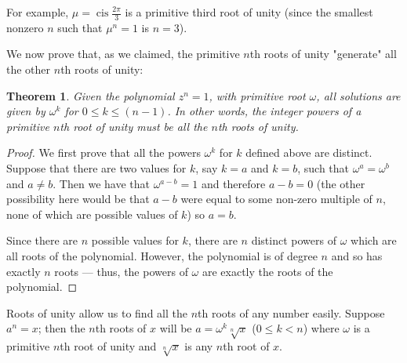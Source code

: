 \documentclass[a4paper,10pt,titlepage]{article}
\newtheorem*{thm}{Theorem}
\theoremstyle{definition}
\DeclareMathOperator{\cis}{cis}
\begin{document}
For example, $ \mu = \cis \frac{2\pi}{3} $ is a primitive third root of unity (since the smallest
nonzero $ n $ such that $ \mu^n = 1 $ is $ n = 3 $).

We now prove that, as we claimed, the primitive $n$th roots of unity "generate" all the other
$ n$th roots of unity:
\begin{thm}
  Given the polynomial $ z^n = 1 $, with primitive root $ \omega $, all solutions
  are given by $ \omega^k $ for $ 0 \leq k \leq (n - 1) $. In other words,
  the integer powers of a primitive $ n$th root of unity must be \emph{all} the
  $n$th roots of unity.
\end{thm}

\begin{proof}
  We first prove that all the powers $ \omega^k $ for $ k $ defined above are distinct.
  Suppose that there are two values for $ k $, say
  $ k = a $ and $ k = b $, such that $ \omega^a = \omega^b $ and $ a \neq b $. Then we have
  that $ \omega^{a-b} = 1 $ and therefore $ a - b = 0 $ (the other possibility here would be
  that $ a - b $ were equal to some non-zero multiple of $ n $, none of which are possible
  values of $ k $) so $ a = b $.

  Since there are $ n $ possible values for $ k $, there are $ n $ distinct powers of $ \omega $
  which are all roots of the polynomial. However, the polynomial is of degree $ n $ and so has
  exactly $ n $ roots --- thus, the powers of $ \omega $ are exactly the roots of the polynomial.
\end{proof}

Roots of unity allow us to find all the $ n$th roots of any number easily. Suppose $ a^n = x $; then
the $ n$th roots of $ x $ will be $ a = \omega^k \sqrt[n]{x} $ ($ 0 \leq k < n $) where $ \omega $ is a
primitive $ n$th root of unity and $ \sqrt[n]{x} $ is any $ n$th root of $ x $.
\end{document}
